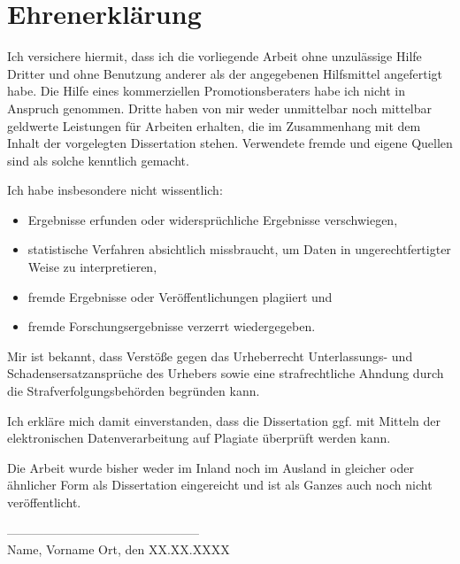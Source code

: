 \section*{Ehrenerklärung}%
Ich versichere hiermit, dass ich die vorliegende Arbeit ohne unzulässige Hilfe Dritter und ohne Benutzung anderer als der angegebenen Hilfsmittel angefertigt habe. Die Hilfe eines kommerziellen Promotionsberaters habe ich nicht in Anspruch genommen. Dritte haben von mir weder unmittelbar noch mittelbar geldwerte Leistungen für Arbeiten erhalten, die im Zusammenhang mit dem Inhalt der vorgelegten Dissertation stehen. Verwendete fremde und eigene Quellen sind als solche kenntlich gemacht.

Ich habe insbesondere nicht wissentlich:%
\begin{itemize}%
	\item Ergebnisse erfunden oder widersprüchliche Ergebnisse verschwiegen,%
	\item statistische Verfahren absichtlich missbraucht, um Daten in ungerechtfertigter Weise zu interpretieren,%
	\item fremde Ergebnisse oder Veröffentlichungen plagiiert und%
	\item fremde Forschungsergebnisse verzerrt wiedergegeben.%
\end{itemize}%
Mir ist bekannt, dass Verstöße gegen das Urheberrecht Unterlassungs- und Schadensersatzansprüche des Urhebers sowie eine strafrechtliche Ahndung durch die Strafverfolgungsbehörden begründen kann.

Ich erkläre mich damit einverstanden, dass die Dissertation ggf. mit Mitteln der elektronischen Datenverarbeitung auf Plagiate überprüft werden kann.

Die Arbeit wurde bisher weder im Inland noch im Ausland in gleicher oder ähnlicher Form als Dissertation eingereicht und ist als Ganzes auch noch nicht veröffentlicht.
\vspace{1cm}%
\begin{flushleft}%
-----------------------------------------------\\%
Name, Vorname%
\hfill%
Ort, den XX.XX.XXXX%
\end{flushleft}%
